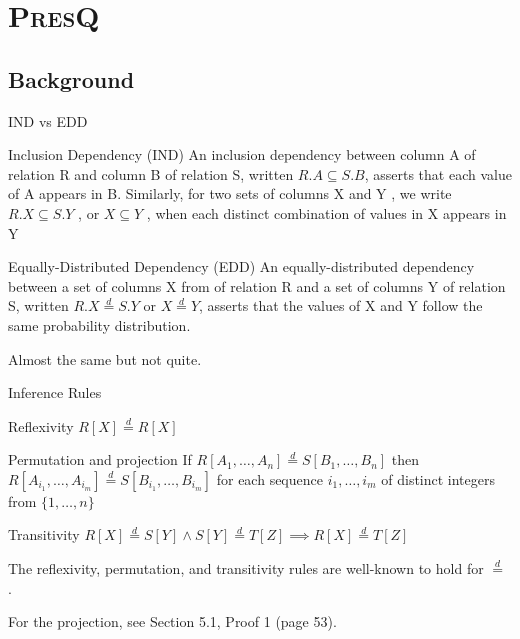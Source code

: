 \documentclass[10pt]{beamer}
\newcommand{\PresQ}[0]{\textsc{PresQ}\xspace}
\newcommand{\eqdist}{\stackrel{d}{=}}
\begin{document}
\section{\PresQ}

\subsection{Background}

\begin{frame}{IND vs EDD}
    \begin{block}{Inclusion Dependency (IND)}
        \smallskip
        An inclusion dependency between column A of relation
        R and column B of relation S, written $R.A \subseteq S.B$, asserts that each
        value of A appears in B. Similarly, for two sets of columns X
        and Y , we write $R.X \subseteq S.Y$ , or $X \subseteq Y$ , when each distinct
        combination of values in X appears in Y~\cite{abedjan2015}
    \end{block}
    \begin{block}{Equally-Distributed Dependency (EDD)}
        \smallskip
        An equally-distributed dependency between a set of columns X from
        of relation R and a set of columns Y of relation S, written $R.X \eqdist S.Y$ or
        $X \eqdist Y$, asserts that the values of X and Y follow the same probability distribution.
    \end{block}
    \alert{Almost the same} but not quite.
\end{frame}

\begin{frame}{Inference Rules}
    \begin{block}{Reflexivity}
        $R[X] \eqdist R[X]$
    \end{block}
    \begin{block}{Permutation and projection}
        If $R[A_1,\dots,A_n] \eqdist S[B_1,\dots,B_n]$ then
        $R[A_{i_1},\dots,A_{i_m}] \eqdist S[B_{i_1},\dots,B_{i_m}]$ for each sequence
        $i_1,\dots,i_m$ of distinct integers from $\{1,\dots,n\}$
    \end{block}
    \begin{block}{Transitivity}
        $ R[X] \eqdist S[Y] \land S[Y] \eqdist T[Z] \implies R[X] \eqdist T[Z]$
    \end{block}
    
    \begin{block}{}
    The reflexivity, permutation, and transitivity rules are well-known to hold
    for $\eqdist$ \cite{randles1979introduction}.

    For the projection, see \alert{Section 5.1, Proof 1} (page 53).
    \end{block}
\end{frame}
\end{document}
